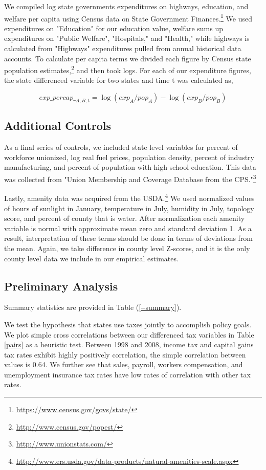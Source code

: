 We compiled log state governments expenditures on highways, education, and welfare per capita using Census data on State Government Finances.\footnote{\url{https://www.census.gov/govs/state/}} We used expenditures on "Education" for our education value, welfare sums up expenditures on "Public Welfare", "Hospitals," and "Health," while highways is calculated from "Highways" expenditures pulled from annual historical data accounts. To calculate per capita terms we divided each figure by Census state population estimates,\footnote{\url{http://www.census.gov/popest/}} and then took logs. For each of our expenditure figures, the state differenced variable for two states and time t was calculated as,

\begin{equation} exp\_percap\__{A,B,t} = \log(exp_{A}/pop_{A}) - \log(exp_{B}/pop_{B}) \end{equation}

\subsection{Additional Controls}

As a final series of controls, we included state level variables for percent of workforce unionized, log real fuel prices, population density, percent of industry manufacturing, and percent of population with high school education. This data was collected from "Union Membership and Coverage Database from the CPS."\footnote{\url{http://www.unionstats.com/}}

Lastly, amenity data was acquired from the USDA.\footnote{\url{http://www.ers.usda.gov/data-products/natural-amenities-scale.aspx}} We used normalized values of hours of sunlight in January, temperature in July, humidity in July, topology score, and percent of county that is water. After normalization each amenity variable is normal with approximate mean zero and standard deviation 1. As a result, interpretation of these terms should be done in terms of deviations from the mean. Again, we take difference in county level Z-scores, and it is the only county level data we include in our empirical estimates.

\subsection{Preliminary Analysis}

Summary statistics are provided in Table (\ref{--summary}).

We test the hypothesis that states use taxes jointly to accomplish policy goals. We plot simple cross correlations between our differenced tax variables in Table \ref{pairs} as a heuristic test. Between 1998 and 2008, income tax and capital gains tax rates exhibit highly positively correlation, the simple correlation between values is 0.64. We further see that sales, payroll, workers compensation, and unemployment insurance tax rates have low rates of correlation with other tax rates. 


